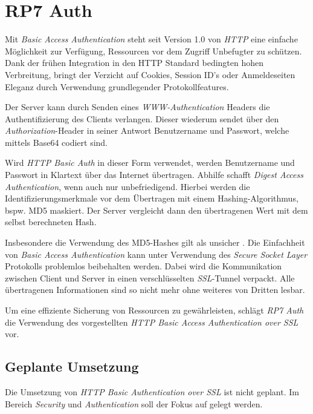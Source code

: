 \section{RP7 Auth}
\label{sec:principle-rp7-auth}


Mit \emph{Basic Access Authentication} \cite{HTTPBasicAuth} steht seit Version 1.0 von \emph{HTTP} eine einfache Möglichkeit zur Verfügung, Ressourcen vor dem Zugriff Unbefugter zu schützen. Dank der frühen Integration in den HTTP Standard bedingten hohen Verbreitung, bringt der Verzicht auf Cookies, Session ID's oder Anmeldeseiten Eleganz durch Verwendung grundlegender Protokollfeatures.

Der Server kann durch Senden eines \emph{WWW-Authentication} Headers die Authentifizierung des Clients verlangen. Dieser wiederum sendet über den \emph{Authorization}-Header in seiner Antwort Benutzername und Passwort, welche mittels Base64 \cite{Base64} codiert sind.

Wird \emph{HTTP Basic Auth} in dieser Form verwendet, werden Benutzername und Passwort in Klartext über das Internet übertragen. Abhilfe schafft \emph{Digest Access Authentication}, wenn auch nur unbefriedigend. Hierbei werden die Identifizierungsmerkmale vor dem Übertragen mit einem Hashing-Algorithmus, bspw. MD5 maskiert. Der Server vergleicht dann den übertragenen Wert mit dem selbst berechneten Hash.

Insbesondere die Verwendung des MD5-Hashes gilt als unsicher \cite{MD5Broken}. Die Einfachheit von \emph{Basic Access Authentication} kann unter Verwendung des \emph{Secure Socket Layer} Protokolls \cite{SSL} problemlos beibehalten werden. Dabei wird die Kommunikation zwischen Client und Server in einen verschlüsselten \emph{\gls{SSL}}-Tunnel verpackt. Alle übertragenen Informationen sind so nicht mehr ohne weiteres von Dritten lesbar.

Um eine effiziente Sicherung von Ressourcen zu gewährleisten, schlägt \emph{RP7 Auth} die Verwendung des vorgestellten \emph{HTTP Basic Access Authentication over SSL} vor.


\subsection*{Geplante Umsetzung}

Die Umsetzung von \emph{HTTP Basic Authentication over SSL} ist nicht geplant. Im Bereich \emph{Security} und \emph{Authentication} soll der Fokus auf  gelegt werden.

